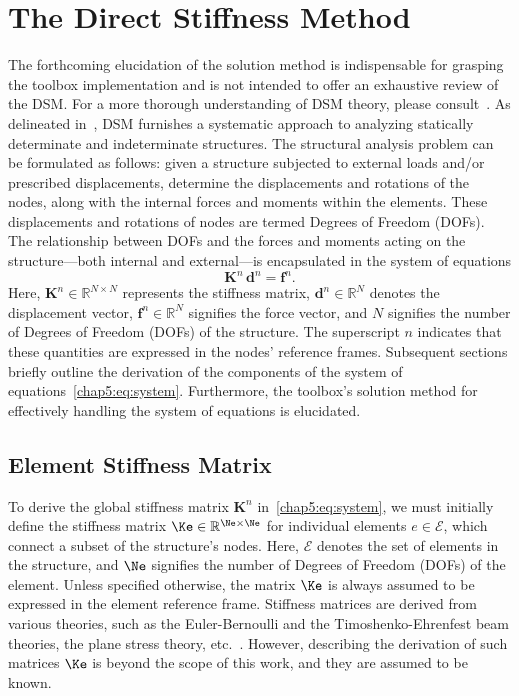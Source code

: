 
\section{The Direct Stiffness Method}
\label{chap5:sec:solution_method}

The forthcoming elucidation of the solution method is indispensable for grasping the toolbox implementation and is not intended to offer an exhaustive review of the \ac{DSM}. For a more thorough understanding of \ac{DSM} theory, please consult~\cite{turner1959direct, turner1964further, logan2002first, hutton2004fundamentals}. As delineated in~\cite{samuelsson2006history}, \ac{DSM} furnishes a systematic approach to analyzing statically determinate and indeterminate structures. The structural analysis problem can be formulated as follows: given a structure subjected to external loads and/or prescribed displacements, determine the displacements and rotations of the nodes, along with the internal forces and moments within the elements. These displacements and rotations of nodes are termed Degrees of Freedom (\acp{DOF}). The relationship between \acp{DOF} and the forces and moments acting on the structure—both internal and external—is encapsulated in the system of equations
%
\begin{equation}
  \label{chap5:eq:system}
  \mathbf{K}^{n} \, \mathbf{d}^{n} = \mathbf{f}^{n}.
\end{equation}
%
Here, $\mathbf{K}^{n} \in \mathbb{R}^{N \times N}$ represents the stiffness matrix, $\mathbf{d}^{n} \in \mathbb{R}^{N}$ denotes the displacement vector, $\mathbf{f}^{n} \in \mathbb{R}^{N}$ signifies the force vector, and $N$ signifies the number of Degrees of Freedom (\acp{DOF}) of the structure. The superscript $n$ indicates that these quantities are expressed in the nodes' reference frames. Subsequent sections briefly outline the derivation of the components of the system of equations~\eqref{chap5:eq:system}. Furthermore, the toolbox's solution method for effectively handling the system of equations is elucidated.

\subsection{Element Stiffness Matrix}

To derive the global stiffness matrix $\mathbf{K}^{n}$ in~\eqref{chap5:eq:system}, we must initially define the stiffness matrix $\Ke \in \mathbb{R}^{\Ne \times \Ne}$ for individual elements $e \in \mathcal{E}$, which connect a subset of the structure's nodes. Here, $\mathcal{E}$ denotes the set of elements in the structure, and $\Ne$ signifies the number of Degrees of Freedom (\acp{DOF}) of the element. Unless specified otherwise, the matrix $\Ke$ is always assumed to be expressed in the element reference frame. Stiffness matrices are derived from various theories, such as the Euler-Bernoulli and the Timoshenko-Ehrenfest beam theories, the plane stress theory, etc.~\cite{hutton2004fundamentals}. However, describing the derivation of such matrices $\Ke$ is beyond the scope of this work, and they are assumed to be known.

